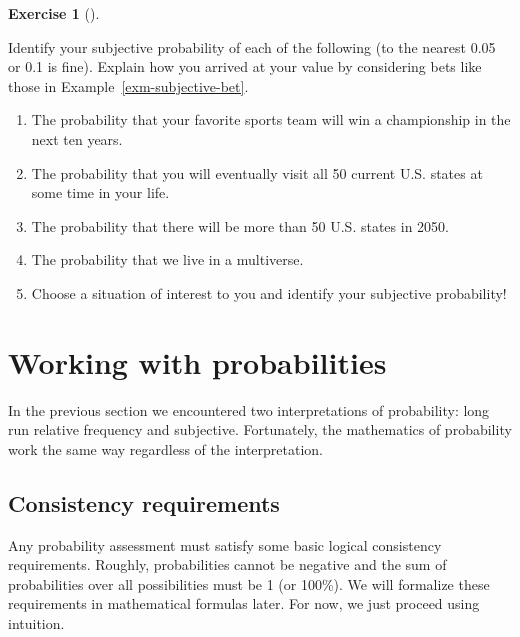 \documentclass[
  letterpaper,
  DIV=11,
  numbers=noendperiod]{scrreprt}
\providecommand{\tightlist}{%
  \setlength{\itemsep}{0pt}\setlength{\parskip}{0pt}}
\theoremstyle{plain}
\theoremstyle{definition}
\theoremstyle{definition}
\newtheorem{exercise}{Exercise}[chapter]
\theoremstyle{definition}
\theoremstyle{remark}
\begin{document}
\begin{exercise}[]\protect\hypertarget{exr-interpret-personal}{}\label{exr-interpret-personal}

Identify your subjective probability of each of the following (to the
nearest 0.05 or 0.1 is fine). Explain how you arrived at your value by
considering bets like those in Example~\ref{exm-subjective-bet}.

\begin{enumerate}
\def\labelenumi{\arabic{enumi}.}
\tightlist
\item
  The probability that your favorite sports team will win a championship
  in the next ten years.
\item
  The probability that you will eventually visit all 50 current U.S.
  states at some time in your life.
\item
  The probability that there will be more than 50 U.S. states in 2050.
\item
  The probability that we live in a multiverse.
\item
  Choose a situation of interest to you and identify your subjective
  probability!
\end{enumerate}

\end{exercise}

\section{Working with probabilities}\label{sec-consistency}

In the previous section we encountered two interpretations of
probability: long run relative frequency and subjective. Fortunately,
the mathematics of probability work the same way regardless of the
interpretation.

\subsection{Consistency requirements}\label{consistency-requirements}

Any probability assessment must satisfy some basic logical consistency
requirements. Roughly, probabilities cannot be negative and the sum of
probabilities over all possibilities must be 1 (or 100\%). We will
formalize these requirements in mathematical formulas later. For now, we
just proceed using intuition.
\end{document}
